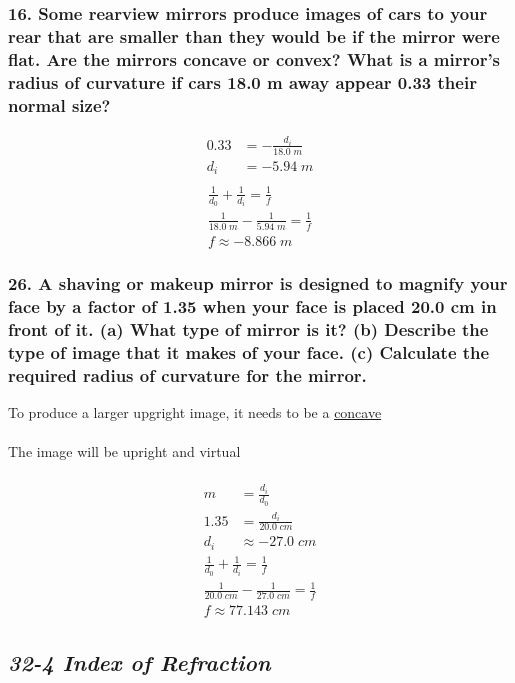 \documentclass{article}
\begin{document}
\subsubsection*{
    16. Some rearview mirrors produce images of cars to your rear that are
    smaller than they would be if the mirror were flat. Are the mirrors
    concave or convex? What is a mirror’s radius of curvature if cars 18.0 m
    away appear 0.33 their normal size?
}
\begin{align*}
    0.33 &= -\displaystyle\frac{d_i}{18.0\;m} \\
    d_i &= -5.94\;m \\
\end{align*}
\begin{gather*}
    \displaystyle\frac{1}{d_0} + \displaystyle\frac{1}{d_i} =
    \displaystyle\frac{1}{f} \\
    \displaystyle\frac{1}{18.0\;m} - \displaystyle\frac{1}{5.94\;m} =
    \displaystyle\frac{1}{f} \\
    f \approx -8.866\;m
\end{gather*}
\subsubsection*{
    26. A shaving or makeup mirror is designed to magnify your face by a factor
    of 1.35 when your face is placed 20.0 cm in front of it. (a) What type of
    mirror is it? (b) Describe the type of image that it makes of your face.
    (c) Calculate the required radius of curvature for the mirror.
}
To produce a larger upgright image, it needs to be a \underline{concave} \\\\
The image will be upright and virtual \\\\
\begin{align*}
    m &= \displaystyle\frac{d_i}{d_0} \\
    1.35 &= \displaystyle\frac{d_i}{20.0\;cm} \\
    d_i &\approx -27.0\;cm
\end{align*}
\begin{gather*}
    \displaystyle\frac{1}{d_0} + \displaystyle\frac{1}{d_i} =
    \displaystyle\frac{1}{f} \\
    \displaystyle\frac{1}{20.0\;cm} - \displaystyle\frac{1}{27.0\;cm} =
    \displaystyle\frac{1}{f} \\
    f \approx 77.143\;cm
\end{gather*}
\newpage 
\begin{center}
    \subsection*{\textbf{\textit{32-4 Index of Refraction}}}
\end{center}
\end{document}
